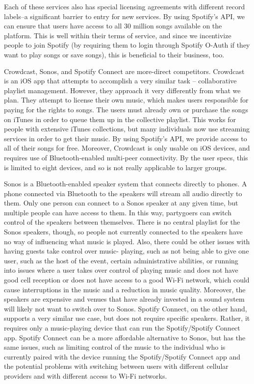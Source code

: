 \documentclass[12pt]{article}
\begin{document}
Each of these services also has special licensing agreements with
different record labels–a significant barrier to entry for new
services. By using Spotify’s API, we can ensure that users have access
to all 30 million songs available on the platform. This is well within
their terms of service, and since we incentivize people to join
Spotify (by requiring them to login through Spotify O-Auth if they
want to play songs or save songs), this is beneficial to their
business, too.

Crowdcast, Sonos, and Spotify Connect are more-direct
competitors. Crowdcast is an iOS app that attempts to accomplish a
very similar task – collaborative playlist management. However, they
approach it very differently from what we plan. They attempt to
license their own music, which makes users responsible for paying for
the rights to songs. The users must already own or purchase the songs
on iTunes in order to queue them up in the collective playlist. This
works for people with extensive iTunes collections, but many
individuals now use streaming services in order to get their music. By
using Spotify’s API, we provide access to all of their songs for
free. Moreover, Crowdcast is only usable on iOS devices, and requires
use of Bluetooth-enabled multi-peer connectivity. By the user specs,
this is limited to eight devices, and so is not really applicable to
larger groups.

Sonos is a Bluetooth-enabled speaker system that connects directly to
phones. A phone connected via Bluetooth to the speakers will stream
all audio directly to them. Only one person can connect to a Sonos
speaker at any given time, but multiple people can have access to
them. In this way, partygoers can switch control of the speakers
between themselves. There is no central playlist for the Sonos
speakers, though, so people not currently connected to the speakers
have no way of influencing what music is played. Also, there could be
other issues with having guests take control over music- playing, such
as not being able to give one user, such as the host of the event,
certain administrative abilities, or running into issues where a user
takes over control of playing music and does not have good cell
reception or does not have access to a good Wi-Fi network, which could
cause interruptions in the music and a reduction in music
quality. Moreover, the speakers are expensive and venues that have
already invested in a sound system will likely not want to switch over
to Sonos. Spotify Connect, on the other hand, supports a very similar
use case, but does not require specific speakers.  Rather, it requires
only a music-playing device that can run the Spotify/Spotify Connect
app. Spotify Connect can be a more affordable alternative to Sonos,
but has the same issues, such as limiting control of the music to the
individual who is currently paired with the device running the
Spotify/Spotify Connect app and the potential problems with switching
between users with different cellular providers and with different
access to Wi-Fi networks.
\end{document}
